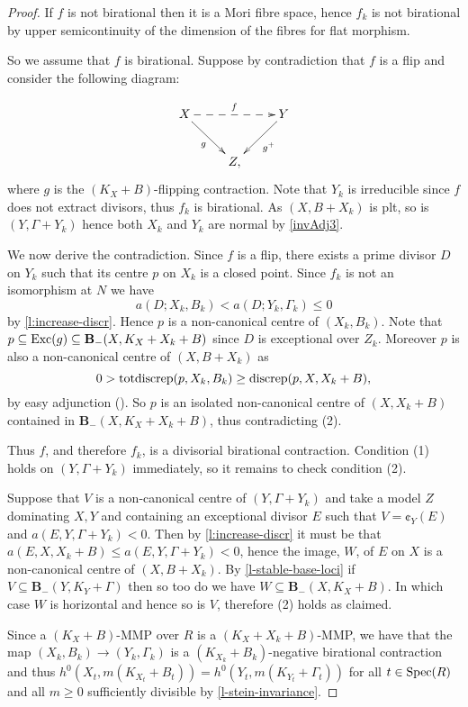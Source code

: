 	\begin{proof}
		If $f$ is not birational then it is a Mori fibre space, hence $f_k$ is not birational by upper semicontinuity of the dimension of the fibres for flat morphism. 
		
		So we assume that $f$ is birational. Suppose by contradiction that $f$ is a flip and consider the following diagram:
		
		\begin{equation*}
		\xymatrix{
			X \ar@{->}_{g}[rd] \ar@{-->}^{f}[rr]
			&
			& Y \ar@{->}^{g^+}[ld]\\
			&Z,}
		\end{equation*} 
		where $g$ is the $(K_X+B)$-flipping contraction.
		Note that $Y_k$ is irreducible since $f$ does not extract divisors, thus $f_k$ is birational. As $(X,B+X_k)$ is plt, so is $(Y,\Gamma+Y_k)$ hence both $X_k$ and $Y_k$ are normal by \autoref{invAdj3}. 
		
		We now derive the contradiction. Since $f$ is a flip, there exists a prime divisor $D$ on $Y_k$ such that its centre $p$ on $X_k$ is a closed point.
		Since $f_k$ is not an isomorphism at $N$ we have
		$$a(D;X_k,B_k)<a(D;Y_k,\Gamma_k)\leq 0$$
		by \autoref{l:increase-discr}.
		Hence $p$ is a non-canonical centre of $(X_{k},B_k)$. Note that $p \subseteq \textup{Exc}(g) \subseteq \mathbf{B}_{-}(X, K_{X}+X_k+B)$ since $D$ is exceptional over $Z_k$. 
		Moreover $p$ is also a non-canonical centre of $(X,B+X_{k})$ as $$0 > \textup{totdiscrep}(p, X_k, B_k) \geq \textup{discrep}(p, X, X_k+B), $$ by easy adjunction (\cite[Theorem 17.2]{FA}).
		So $p$ is an isolated non-canonical centre of $(X,X_k+B)$ contained in $\mathbf{B}_{-}(X, K_{X}+X_k+B)$, thus contradicting (2).
		
		Thus $f$, and therefore $f_k$, is a divisorial birational contraction. Condition (1) holds on $(Y,\Gamma+Y_k)$ immediately, so it remains to check condition (2).
		
		Suppose that $V$ is a non-canonical centre of $(Y,\Gamma+Y_{k})$ and take a model $Z$ dominating $X,Y$ and containing an exceptional divisor $E$ such that $V=\cent_Y(E)$ and $a(E, Y, \Gamma+Y_{k}) <0$. Then by \autoref{l:increase-discr} it must be that $a(E,X,X_k+B) \leq a(E,Y,\Gamma+Y_{k}) < 0$, hence the image, $W$, of $E$ on $X$ is a non-canonical centre of $(X,B+X_{k})$. By \autoref{l-stable-base-loci} if $V \subseteq \mathbf{B}_{-}(Y, K_{Y}+\Gamma)$ then so too do we have $W \subseteq \mathbf{B}_{-}(X, K_{X}+B)$. In which case $W$ is horizontal and hence so is $V$, therefore (2) holds as claimed.

		Since a $(K_X+B)$-MMP over $R$ is a $(K_X+X_k+B)$-MMP, we have that the map $(X_k,B_k) \rightarrow (Y_k, \Gamma_k)$ is a $(K_{X_k}+B_k)$-negative birational contraction and thus $h^0(X_t,m(K_{X_t}+B_t))=h^0(Y_t,m(K_{Y_t}+\Gamma_t))$ for all $t\in\operatorname{Spec} (R)$ and all $m\geq 0$ sufficiently divisible by \autoref{l-stein-invariance}.
	\end{proof}
	
